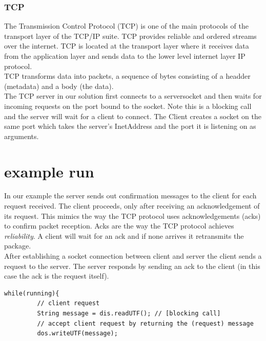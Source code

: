 \subsubsection{TCP}

The Transmission Control Protocol (TCP) is one of the main protocols of the transport layer of the TCP/IP suite. TCP provides reliable and ordered streams over the internet. TCP is located at the transport layer where it  receives data from the application layer and sends data to the lower level internet layer IP protocol. \\

TCP transforms data into packets, a sequence of bytes consisting of a headder (metadata) and a body (the data). \\

The TCP server in our solution first connects to a serversocket and then waits for incoming requests on the port bound to the socket. Note this is a blocking call and the server will wait for a client to connect. The Client creates a socket on the same port which takes the server's InetAddress and the port it is listening on as arguments. \\



\section{example run}
\label{tcp_example}

In our example the server sends out confirmation messages to the client for each request received. The client proceeds, only after receiving an acknowledgement of its request. This mimics the way the TCP protocol uses acknowledgements (acks) to confirm packet reception. Acks are the way the TCP protocol achieves \textit{reliability}. A client will wait for an ack and if none arrives it retransmits the package.\\   

After establishing a socket connection between client and server the client sends a request to the server. The server responds by sending an ack to the client (in this case the ack is the request itself).
% 

\begin{lstlisting}[caption= server sends an ack to a request]
while(running){
         // client request
         String message = dis.readUTF(); // [blocking call]
         // accept client request by returning the (request) message
         dos.writeUTF(message);    

\end{lstlisting}

